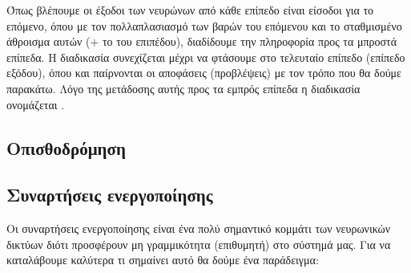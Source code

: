 Όπως βλέπουμε οι έξοδοι των νευρώνων από κάθε επίπεδο είναι είσοδοι για το επόμενο,
όπου με τον πολλαπλασιασμό των βαρών του επόμενου και το σταθμισμένο άθροισμα αυτών
($+$ το  του επιπέδου), διαδίδουμε την πληροφορία προς τα μπροστά επίπεδα. Η
διαδικασία συνεχίζεται μέχρι να φτάσουμε στο τελευταίο επίπεδο (επίπεδο εξόδου), όπου
και παίρνονται οι αποφάσεις (προβλέψεις) με τον τρόπο που θα δούμε παρακάτω. Λόγο της
μετάδοσης αυτής προς τα εμπρός επίπεδα η διαδικασία ονομάζεται .
\subsection{Οπισθοδρόμηση}

\subsection{Συναρτήσεις ενεργοποίησης}
Οι συναρτήσεις ενεργοποίησης είναι ένα πολύ σημαντικό κομμάτι των νευρωνικών δικτύων διότι προσφέρουν μη γραμμικότητα (επιθυμητή) στο σύστημά μας. Για να καταλάβουμε καλύτερα τι σημαίνει αυτό θα δούμε ένα παράδειγμα\cite{nnactmlm}:


